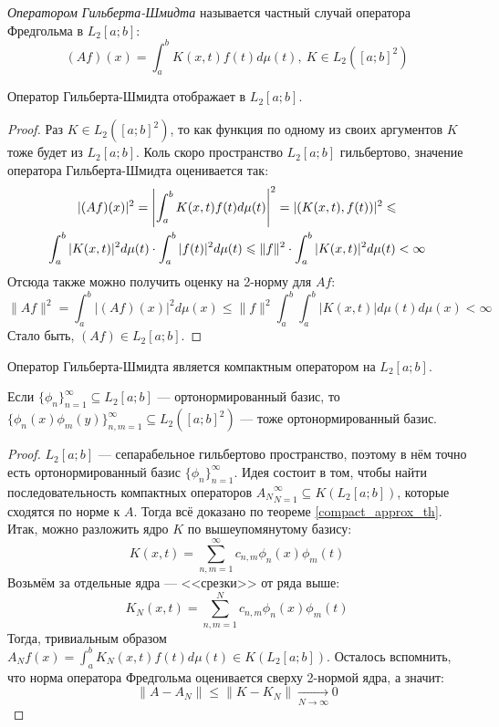 \begin{definition}
	\textit{Оператором Гильберта-Шмидта} называется частный случай оператора Фредгольма в $L_2[a; b]$:
	\[
		(Af)(x) = \int_a^b K(x, t)f(t)d\mu(t),\ K \in L_2([a; b]^2)
	\]
\end{definition}

\begin{proposition}
	Оператор Гильберта-Шмидта отображает в $L_2[a; b]$.
\end{proposition}

\begin{proof}
	Раз $K \in L_2([a; b]^2)$, то как функция по одному из своих аргументов $K$ тоже будет из $L_2[a; b]$. Коль скоро пространство $L_2[a; b]$ гильбертово, значение оператора Гильберта-Шмидта оценивается так:
	\begin{multline*}
		|(Af)(x)|^2 = \left|\int_a^b K(x, t)f(t)d\mu(t)\right|^2 = |(K(x, t), f(t))|^2 \leqslant
		\\
		\int_a^b |K(x, t)|^2d\mu(t) \cdot \int_a^b |f(t)|^2d\mu(t) \leqslant \|f\|^2 \cdot \int_a^b |K(x, t)|^2d\mu(t) < \infty
	\end{multline*}
	Отсюда также можно получить оценку на 2-норму для $Af$:
	\[
		\|Af\|^2 = \int_a^b |(Af)(x)|^2d\mu(x) \le \|f\|^2 \int_a^b \int_a^b |K(x, t)|d\mu(t)d\mu(x) < \infty
	\]
	Стало быть, $(Af) \in L_2[a; b]$.
\end{proof}

\begin{theorem}
	Оператор Гильберта-Шмидта является компактным оператором на $L_2[a; b]$.
\end{theorem}

\begin{reminder}
	Если $\{\phi_n\}_{n = 1}^\infty \subseteq L_2[a; b]$ --- ортонормированный базис, то \\ $\{\phi_n(x)\phi_m(y)\}_{n, m = 1}^\infty \subseteq L_2([a; b]^2)$ --- тоже ортонормированный базис.
\end{reminder}

\begin{proof}
	$L_2[a; b]$ --- сепарабельное гильбертово пространство, поэтому в нём точно есть ортонормированный базис $\{\phi_n\}_{n = 1}^\infty$. Идея состоит в том, чтобы найти последовательность компактных операторов ${A_N}_{N = 1}^\infty \subseteq K(L_2[a; b])$, которые сходятся по норме к $A$. Тогда всё доказано по теореме \ref{compact_approx_th}. Итак, можно разложить ядро $K$ по вышеупомянутому базису:
	\[
		K(x, t) = \sum_{n, m = 1}^\infty c_{n, m}\phi_n(x)\phi_m(t)
	\]
	Возьмём за отдельные ядра --- <<срезки>> от ряда выше:
	\[
		K_N(x, t) = \sum_{n, m = 1}^N c_{n, m}\phi_n(x)\phi_m(t)
	\]
	Тогда, тривиальным образом $A_Nf(x) = \int_a^b K_N(x, t)f(t)d\mu(t) \in K(L_2[a; b])$. Осталось вспомнить, что норма оператора Фредгольма оценивается сверху 2-нормой ядра, а значит:
	\[
		\|A - A_N\| \le \|K - K_N\| \xrightarrow[N \to \infty]{} 0
	\]
\end{proof}


